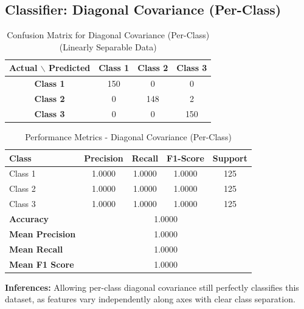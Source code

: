 \subsection{Classifier: Diagonal Covariance (Per-Class)}


\begin{table}[H]
\centering
\caption{Confusion Matrix for Diagonal Covariance (Per-Class) (Linearly Separable Data)}
\label{tab:confmat_LSD_Diagonal Covariance (Per-Class)}
\begin{tabular}{|c|c|c|c|}
\hline
\textbf{Actual $\backslash$ Predicted} & \textbf{Class 1} & \textbf{Class 2} & \textbf{Class 3} \\
\hline
\textbf{Class 1} & 150 & 0   & 0   \\
\textbf{Class 2} & 0  & 148 & 2   \\
\textbf{Class 3} & 0   & 0   & 150 \\
\hline
\end{tabular}
\end{table}


\begin{table}[H]
\centering
\caption{Performance Metrics - Diagonal Covariance (Per-Class)}
\begin{tabular}{lcccc}
\toprule
\textbf{Class} & \textbf{Precision} & \textbf{Recall} & \textbf{F1-Score} & \textbf{Support} \\
\midrule
Class 1 & 1.0000 & 1.0000 & 1.0000 & 125 \\
Class 2 & 1.0000 & 1.0000 & 1.0000 & 125 \\
Class 3 & 1.0000 & 1.0000 & 1.0000 & 125 \\
\midrule
\textbf{Accuracy} & \multicolumn{4}{c}{1.0000} \\
\textbf{Mean Precision} & \multicolumn{4}{c}{1.0000} \\
\textbf{Mean Recall} & \multicolumn{4}{c}{1.0000} \\
\textbf{Mean F1 Score} & \multicolumn{4}{c}{1.0000} \\
\bottomrule
\end{tabular}
\end{table}

\textbf{Inferences:} Allowing per-class diagonal covariance still perfectly classifies this dataset, as features vary independently along axes with clear class separation.

